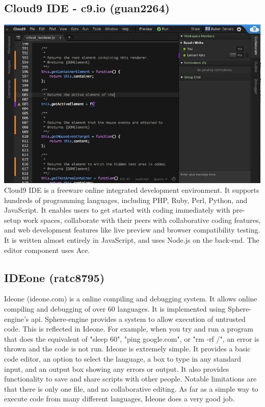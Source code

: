 \documentclass[11pt]{report}
\begin{document}
\begin{IDE-like Features}
\begin{}
\begin{Collaborative features that would be "nice":}
\subsection{Cloud9 IDE - c9.io (guan2264)}
\includegraphics[width=\textwidth]{cloud9}
Cloud9 IDE is a freeware online integrated development environment. It supports hundreds of programming languages, including PHP, Ruby, Perl, Python, and JavaScript. It enables users to get started with coding immediately with pre-setup work spaces, collaborate with their peers with collaborative coding features, and web development features like live preview and browser compatibility testing. It is written almost entirely in JavaScript, and uses Node.js on the back-end. The editor component uses Ace. 

\subsection{IDEone (ratc8795)}
Ideone (ideone.com) is a online compiling and debugging system. It allows online compiling and debugging of over 60 languages. It is implemented using Sphere-engine's api. Sphere-engine provides a system to allow execution of untrusted code. This is reflected in Ideone. For example, when you try and run a program that does the equivalent of "sleep 60", "ping google.com", or "rm -rf /", an error is thrown and the code is not run. Ideone is extremely simple. It provides a basic code editor, an option to select the language, a box to type in any standard input, and an output box showing any errors or output. It also provides functionality to save and share scripts with other people. Notable limitations are that there is only one file, and no collaborative editing. As far as a simple way to execute code from many different languages, Ideone does a very good job.


\end{Collaborative features that would be "nice":}
\end{}
\end{IDE-like Features}
\end{document}
